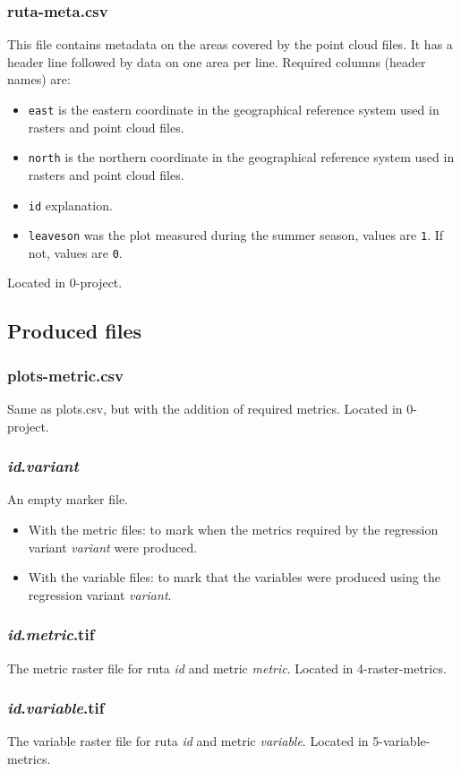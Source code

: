 \documentclass[english,a4paper,minion,nofigsidecaption]{article}
\newcommand{\file}[1]{\textsf{#1}}
\renewcommand{\tt}[1]{\texttt{#1}}
\newcommand{\id}{\emph{id}}
\begin{document}
\subsubsection{ruta-meta.csv}
This file contains metadata on the areas covered by the point cloud files. It has a header line followed by data on one area per line. Required columns (header names) are:
\begin{itemize}
	\item\tt{east} is the eastern coordinate in the geographical reference system used in rasters and point cloud files.
	\item\tt{north} is the northern coordinate in the geographical reference system used in rasters and point cloud files.
	\item\tt{id} explanation.
	\item\tt{leaveson} was the plot measured during the summer season, values are \tt{1}. If not, values are \tt{0}.
\end{itemize}
Located in \file{0-project}.


\subsection{Produced files}

\subsubsection{plots-metric.csv}
Same as plots.csv, but with the addition of required metrics. 
Located in \file{0-project}.

\subsubsection{{\id}.\emph{variant}}
An empty marker file. 
\begin{itemize}
	\item With the metric files: to mark when the metrics required by the regression variant \emph{variant} were produced.
	\item With the variable files: to mark that the variables were produced using the regression variant \emph{variant}.
\end{itemize}

\subsubsection{{\id}.\emph{metric}.tif}
The metric raster file for ruta {\id} and metric \emph{metric}. 
Located in \file{4-raster-metrics}.

\subsubsection{{\id}.\emph{variable}.tif}
The variable raster file for ruta {\id} and metric \emph{variable}. 
Located in \file{5-variable-metrics}.
\end{document}
